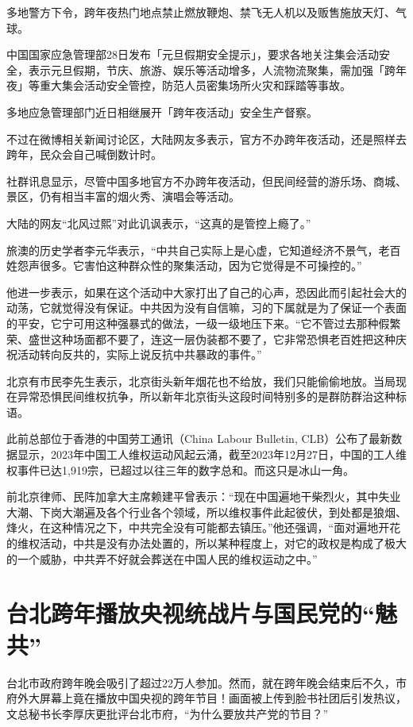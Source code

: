 多地警方下令，跨年夜热门地点禁止燃放鞭炮、禁飞无人机以及贩售施放天灯、气球。

中国国家应急管理部28日发布「元旦假期安全提示」，要求各地关注集会活动安全，表示元旦假期，节庆、旅游、娱乐等活动增多，人流物流聚集，需加强「跨年夜」等重大集会活动安全管控，防范人员密集场所火灾和踩踏等事故。

多地应急管理部门近日相继展开「跨年夜活动」安全生产督察。

不过在微博相关新闻讨论区，大陆网友多表示，官方不办跨年夜活动，还是照样去跨年，民众会自己喊倒数计时。

社群讯息显示，尽管中国多地官方不办跨年夜活动，但民间经营的游乐场、商城、景区，仍有相当丰富的烟火秀、演唱会等活动。 

大陆的网友“北风过熙”对此讥讽表示，“这真的是管控上瘾了。”

旅澳的历史学者李元华表示，“中共自己实际上是心虚，它知道经济不景气，老百姓怨声很多。它害怕这种群众性的聚集活动，因为它觉得是不可操控的。”

他进一步表示，如果在这个活动中大家打出了自己的心声，恐因此而引起社会大的动荡，它就觉得没有保证。中共因为没有自信嘛，习的下属就是为了保证一个表面的平安，它宁可用这种强暴式的做法，一级一级地压下来。“它不管过去那种假繁荣、盛世这种场面都不要了，连这一层伪装都不要了，它非常恐惧老百姓把这种庆祝活动转向反共的，实际上说反抗中共暴政的事件。”

北京有市民李先生表示，北京街头新年烟花也不给放，我们只能偷偷地放。当局现在异常恐惧民间维权抗争，所以新年北京街头这段时间特别多的是群防群治这种标语。

此前总部位于香港的中国劳工通讯（China Labour Bulletin, CLB）公布了最新数据显示，2023年中国工人维权运动风起云涌，截至2023年12月27日，中国的工人维权事件已达1,919宗，已超过以往三年的数字总和。而这只是冰山一角。

前北京律师、民阵加拿大主席赖建平曾表示：“现在中国遍地干柴烈火，其中失业大潮、下岗大潮遍及各个行业各个领域，所以维权事件此起彼伏，到处都是狼烟、烽火，在这种情况之下，中共完全没有可能都去镇压。”他还强调，“面对遍地开花的维权活动，中共是没有办法处置的，所以某种程度上，对它的政权是构成了极大的一个威胁，中共弄不好就会葬送在中国人民的维权运动之中。”

\section{台北跨年播放央视统战片与国民党的“魅共”}

台北市政府跨年晚会吸引了超过22万人参加。然而，就在跨年晚会结束后不久，市府外大屏幕上竟在播放中国央视的跨年节目！画面被上传到脸书社团后引发热议，文总秘书长李厚庆更批评台北市府，“为什么要放共产党的节目？”

